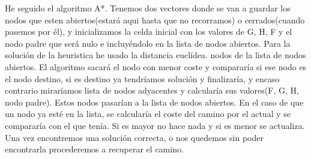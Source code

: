 He seguido el algoritmo A*.
Tenemos dos vectores donde se van a guardar los nodos que esten abiertos(estará aqui hasta que no recorramos) o cerrados(cuando pasemos por él),
y inicializamos la celda inicial con los valores de G, H, F y el nodo padre que
será nulo e incluyéndolo en la lista de nodos abiertos.
Para la solución de la heuristica he usado la distancia euclídea.
nodos de la lista de nodos abiertos. El algoritmo sacará el nodo con menor coste y compararía si ese nodo es
el nodo destino, si es destino ya tendríamos solución y finalizaría, y encaso contrario miraríamos
lista de nodos adyacentes y calcularía sus valores(F, G, H, nodo padre). Estos nodos pasarían a la lista de
nodos abiertos. En el caso de que un nodo ya esté en la lista, se calcularía el coste del camino por el actual y
se compararía con el que tenía. Si es mayor no hace nada y si es menor se actualiza.
Una vez encontremos una solución correcta, o nos quedemos sin poder encontrarla procederemos a recuperar
el camino.
